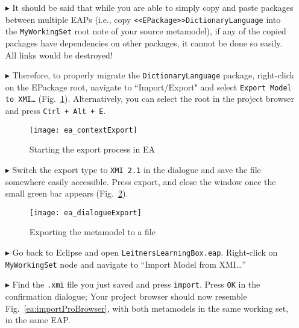 \begin{itemize}
\item[$\blacktriangleright$] It should be said that while you are able to simply copy and paste packages between multiple EAPs (i.e., copy
\texttt{<<E\-Pack\-age>>Dict\-ion\-ary\-Lang\-uage} into the \texttt{MyWorkingSet} root note of your source metamodel), if any of the copied packages have
dependencies on other packages, it cannot be done so easily. All links would be destroyed! 

\clearpage

\item[$\blacktriangleright$] Therefore, to properly migrate the \texttt{DictionaryLanguage} package, right-click on the EPackage root, navigate to
``Import/Export" and select \texttt{Export Model to XMI\ldots} (Fig.~\ref{ea:contextExport}). Alternatively, you can select the root in the project browser and
press \texttt{Ctrl + Alt + E}.

\vspace{0.5cm}

\begin{figure}[htbp]
\begin{center}
  \texttt{[image: ea\_contextExport]}
  \caption{Starting the export process in EA}
  \label{ea:contextExport}
\end{center}
\end{figure}

\item[$\blacktriangleright$] Switch the export type to \texttt{XMI 2.1} in the dialogue and save the file somewhere easily accessible. Press export, and close
the window once the small green bar appears (Fig.~\ref{ea:export}).

\begin{figure}[htbp]
\begin{center}
  \texttt{[image: ea\_dialogueExport]}
  \caption{Exporting the metamodel to a file}
  \label{ea:export}
\end{center}
\end{figure}

\item[$\blacktriangleright$] Go back to Eclipse and open \texttt{LeitnersLearningBox.eap}. Right-click on \texttt{MyWorkingSet} node and navigate to ``Import
Model from XMI\ldots''

\item[$\blacktriangleright$] Find the \texttt{.xmi} file you just saved and press \texttt{import}. Press \texttt{OK} in the confirmation dialogue; Your project
browser should now resemble Fig.~\ref{ea:importProBrowser}, with both metamodels in the same working set, in the same EAP.


\end{itemize}
